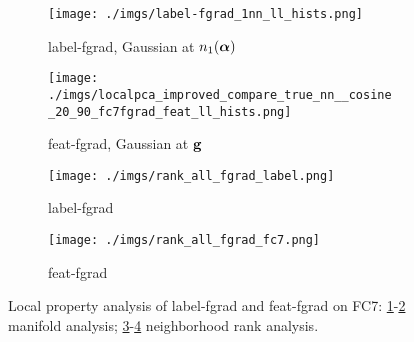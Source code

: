\documentclass{article} %
\begin{document}
\begin{figure}[h!]
\centering
\begin{subfigure}[t]{.325\linewidth}
\begin{center}
\texttt{[image: ./imgs/label-fgrad\_1nn\_ll\_hists.png]}
\end{center}
\caption{\small{label-fgrad, Gaussian at $n_1(\boldsymbol{\mathbf{\alpha}})$}}
\label{fig:manifold_label}
\end{subfigure}
\begin{subfigure}[t]{.325\linewidth}
\begin{center}
\texttt{[image: ./imgs/localpca\_improved\_compare\_true\_nn\_\_cosine\_20\_90\_fc7fgrad\_feat\_ll\_hists.png]}
\end{center}
\caption{\small{feat-fgrad, Gaussian at $\boldsymbol{\mathbf{g}}$}}
\label{fig:manifold_feat}
\end{subfigure}

\begin{subfigure}[t]{.325\linewidth}
\texttt{[image: ./imgs/rank\_all\_fgrad\_label.png]}
\caption{\small{label-fgrad}}
\label{fig:rank_label}
\end{subfigure}
\begin{subfigure}[t]{.325\linewidth}
\texttt{[image: ./imgs/rank\_all\_fgrad\_fc7.png]}
\caption{\small{feat-fgrad}}
\label{fig:rank_feat}
\end{subfigure}

\caption{Local property analysis of label-fgrad and feat-fgrad on FC7: \ref{fig:manifold_label}-\ref{fig:manifold_feat} manifold analysis; \ref{fig:rank_label}-\ref{fig:rank_feat} neighborhood rank analysis.}
\label{fig:fgrad_plots}
\end{figure}%
\end{document}

